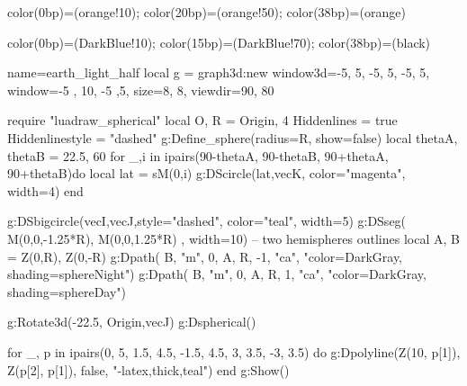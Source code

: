 \documentclass{standalone}
\begin{document}
{\pgfpoint{20 bp}{0 bp}}
{color(0bp)=(orange!10); color(20bp)=(orange!50); color(38bp)=(orange)}%

{\pgfpoint{50 bp}{0 bp}}
{color(0bp)=(DarkBlue!10); color(15bp)=(DarkBlue!70); color(38bp)=(black)}%

\begin{luadraw}{name=earth_light_half}
local g = graph3d:new{
    window3d={-5, 5, -5, 5, -5, 5},
    window={-5 , 10, -5 ,5},
    size={8, 8},
    viewdir={90, 80}
}

require "luadraw_spherical"
local O, R = Origin, 4
Hiddenlines = true
Hiddenlinestyle = "dashed"
g:Define_sphere({radius=R, show=false})
local thetaA, thetaB = 22.5, 60
for _,i in ipairs({90-thetaA, 90-thetaB, 90+thetaA, 90+thetaB})do
    local lat = sM(0,i)
    g:DScircle({lat,vecK}, {color="magenta", width=4})
end

g:DSbigcircle({vecI,vecJ},{style="dashed", color="teal", width=5})
g:DSseg({ M(0,0,-1.25*R), M(0,0,1.25*R) }, {width=10})
-- two hemispheres outlines
local A, B = Z(0,R), Z(0,-R)
g:Dpath({ B, "m", 0, A, R, -1, "ca"}, "color=DarkGray, shading=sphereNight")
g:Dpath({ B, "m", 0, A, R, 1, "ca"}, "color=DarkGray, shading=sphereDay")

g:Rotate3d(-22.5, {Origin,vecJ})
g:Dspherical()

for _, p in ipairs({{0, 5}, {1.5, 4.5}, {-1.5, 4.5}, {3, 3.5}, {-3, 3.5}}) do
    g:Dpolyline({Z(10, p[1]), Z(p[2], p[1])}, false, "-latex,thick,teal")
end
g:Show()
\end{luadraw}
\end{document}
